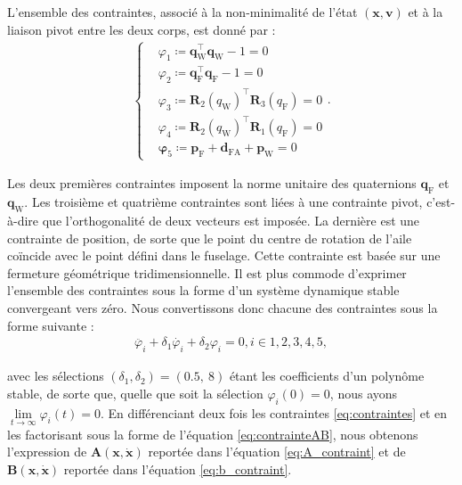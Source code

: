 L'ensemble des contraintes, associé à la non-minimalité de l'état $(\boldsymbol{x},\boldsymbol{v})$ et à la liaison pivot entre les deux corps, est donné par :
\begin{align}
    \label{eq:contraintes}
    \left\{
    \begin{aligned}
    &\varphi_{1} \coloneqq \boldsymbol{q}_{\text{W}}^\top \boldsymbol{q}_{\text{W}} - 1 = 0\\
    &\varphi_{2} \coloneqq \boldsymbol{q}_{\text{F}}^\top \boldsymbol{q}_{\text{F}} - 1 = 0\\
    &\varphi_{3} \coloneqq \boldsymbol{R}_{2}(q_{\text{W}})^\top \boldsymbol{R}_{3}(q_{\text{F}}) = 0\\
    &\varphi_{4} \coloneqq \boldsymbol{R}_{2}(q_{\text{W}})^\top \boldsymbol{R}_{1}(q_{\text{F}}) = 0\\
    &\boldsymbol{\varphi}_{5} \coloneqq \boldsymbol{p}_{\text{F}} + \boldsymbol{d}_{\text{FA}} + \boldsymbol{p}_{\text{W}} = 0
    \end{aligned}.
    \right.
\end{align}

Les deux premières contraintes imposent la norme unitaire des quaternions $\boldsymbol{q}_{\text{F}}$ et $\boldsymbol{q}_{\text{W}}$.
Les troisième et quatrième contraintes sont liées à une contrainte pivot, c'est-à-dire que l'orthogonalité de deux vecteurs est imposée. La dernière est une contrainte de position, de sorte que le point du centre de rotation de l'aile coïncide avec le point défini dans le fuselage. Cette contrainte est basée sur une fermeture géométrique tridimensionnelle.
Il est plus commode d'exprimer l'ensemble des contraintes sous la forme d'un système dynamique stable convergeant vers zéro. Nous convertissons donc chacune des contraintes sous la forme suivante :
\begin{align}
    \ddot{\varphi_{i}} + \delta_{1} \dot{\varphi_{i}}  + \delta_{2} \varphi_{i} = 0, i \in {1,2,3,4,5},
\end{align}

avec les sélections $(\delta_{1}, \delta_{2}) = (0.5,~8)$ étant les coefficients d'un polynôme stable, de sorte que, quelle que soit la sélection $\varphi_{i}(0) = 0$, nous ayons $\lim\limits_{t \to \infty} \varphi_{i}(t) = 0$. En différenciant deux fois les contraintes \eqref{eq:contraintes} et en les factorisant sous la forme de l'équation \eqref{eq:contrainteAB}, nous obtenons l'expression de $\boldsymbol{A}(\boldsymbol{x},\dot{\boldsymbol{x}})$ reportée dans l'équation \eqref{eq:A_contraint} et de $\boldsymbol{B}(\boldsymbol{x},\dot{\boldsymbol{x}})$ reportée dans l'équation \eqref{eq:b_contraint}.

